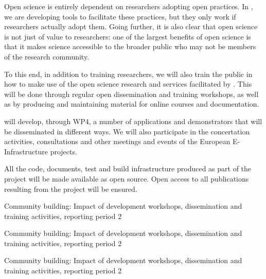 \begin{workpackage}
\begin{wpdescription}

Open science is entirely dependent on researchers adopting open practices.
In \TheProject, we are developing tools to facilitate these practices,
but they only work if researchers actually adopt them.
Going further, it is also clear that open science is not just of value
to researchers: one of the largest benefits of open science is that it makes
science accessible to the broader public who may not be members of the
research community.

To this end, in addition to training researchers, we will also train the public in how to
make use of the open science research and services facilitated by \TheProject.
This will be done through regular open dissemination and training workshops, as well as
by producing and maintaining material for online courses and documentation.

\TheProject will develop, through WP4, a number of applications and demonstrators that
will be disseminated in different ways.
We will also participate in the concertation activities,
consultations and other meetings and events of the European
E-Infrastructure projects.

All the code, documents, test and build infrastructure produced as
part of the project will be made available as open source.
Open access to all publications resulting from the project will be ensured.


\end{wpdescription}

\begin{tasklist}




\end{tasklist}


\begin{wpdelivs}
\begin{wpdeliv}[due=18,id=report1,dissem=PU,miles=xxx,nature=R,lead=INSERM]
  {Community building: Impact of development workshops, dissemination and training activities, reporting period 2}
\end{wpdeliv}
\begin{wpdeliv}[due=36,id=report2,dissem=PU,miles=xxx,nature=R,lead=INSERM]
  {Community building: Impact of development workshops, dissemination and training activities, reporting period 2}
\end{wpdeliv}
\begin{wpdeliv}[due=48,id=report3,dissem=PU,miles=xxx,nature=R,lead=INSERM]
  {Community building: Impact of development workshops, dissemination and training activities, reporting period 2}
\end{wpdeliv}
\end{wpdelivs}

\end{workpackage}

